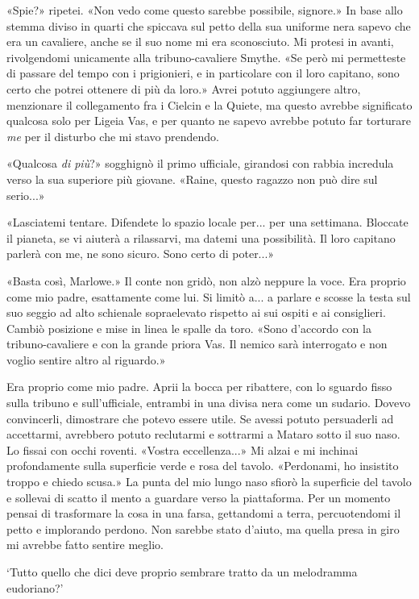 «Spie?» ripetei. «Non vedo come questo sarebbe possibile, signore.» In
base allo stemma diviso in quarti che spiccava sul petto della sua
uniforme nera sapevo che era un cavaliere, anche se il suo nome mi era
sconosciuto. Mi protesi in avanti, rivolgendomi unicamente alla
tribuno-cavaliere Smythe. «Se però mi permetteste di passare del tempo
con i prigionieri, e in particolare con il loro capitano, sono certo che
potrei ottenere di più da loro.» Avrei potuto aggiungere altro,
menzionare il collegamento fra i Cielcin e la Quiete, ma questo avrebbe
significato qualcosa solo per Ligeia Vas, e per quanto ne sapevo avrebbe
potuto far torturare \emph{me} per il disturbo che mi stavo prendendo.

«Qualcosa \emph{di più}?» sogghignò il primo ufficiale, girandosi con
rabbia incredula verso la sua superiore più giovane. «Raine, questo
ragazzo non può dire sul serio...»

«Lasciatemi tentare. Difendete lo spazio locale per... per una
settimana. Bloccate il pianeta, se vi aiuterà a rilassarvi, ma datemi
una possibilità. Il loro capitano parlerà con me, ne sono sicuro. Sono
certo di poter...»

«Basta così, Marlowe.» Il conte non gridò, non alzò neppure la voce. Era
proprio come mio padre, esattamente come lui. Si limitò a... a parlare e
scosse la testa sul suo seggio ad alto schienale sopraelevato rispetto
ai sui ospiti e ai consiglieri. Cambiò posizione e mise in linea le
spalle da toro. «Sono d'accordo con la tribuno-cavaliere e con la grande
priora Vas. Il nemico sarà interrogato e non voglio sentire altro al
riguardo.»

Era proprio come mio padre. Aprii la bocca per ribattere, con lo sguardo
fisso sulla tribuno e sull'ufficiale, entrambi in una divisa nera come
un sudario. Dovevo convincerli, dimostrare che potevo essere utile. Se
avessi potuto persuaderli ad accettarmi, avrebbero potuto reclutarmi e
sottrarmi a Mataro sotto il suo naso. Lo fissai con occhi roventi.
«Vostra eccellenza...» Mi alzai e mi inchinai profondamente sulla
superficie verde e rosa del tavolo. «Perdonami, ho insistito troppo e
chiedo scusa.» La punta del mio lungo naso sfiorò la superficie del
tavolo e sollevai di scatto il mento a guardare verso la piattaforma.
Per un momento pensai di trasformare la cosa in una farsa, gettandomi a
terra, percuotendomi il petto e implorando perdono. Non sarebbe stato
d'aiuto, ma quella presa in giro mi avrebbe fatto sentire meglio.

`Tutto quello che dici deve proprio sembrare tratto da un melodramma
eudoriano?'

